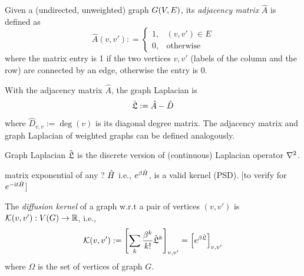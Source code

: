 \begin{definition}\label{def:adjacency_matrix}
	Given a (undirected, unweighted) graph $G(V,E)$, its \emph{adjacency matrix} $\hat{A}$ is defined as
	\begin{equation}
		\hat{A}(v,v') : = 
		\begin{cases}
			1, & (v,v') \in E \\
			0, & \text{otherwise}
		\end{cases}
	\end{equation}
	where the matrix entry is 1 if the two vertices $v,v'$ (labels of the column and the row) are connected by an edge, otherwise the entry is 0.
\end{definition}
\begin{definition}\label{def:graph_laplacian}
	With the adjacency matrix $\hat{A}$, the graph Laplacian is
	\begin{equation}
		\hat{\mathfrak{L}}:=\hat{A}-\hat{D}	
	\end{equation}
	where $\hat{D}_{v,v}:=\deg(v)$ is its diagonal degree matrix.
	The adjacency matrix and graph Laplacian of weighted graphs can be defined analogously.
\end{definition}
\begin{remark}
	Graph Laplacian $\hat{\mathfrak{L}}$ is the 
	discrete version of (continuous) Laplacian operator $\laplacian$.
	\cite{chungSpectralGraphTheory1997}
\end{remark}
\begin{lemma}
	matrix exponential of any ? $\hat{H}$ i.e., $e^{\beta \hat{H}}$, is a valid kernel (PSD). [to verify for $e^{-\textup{i} t\hat{H}}$]
\end{lemma}
\begin{definition}\label{def:diffusion_kernel}
	The \emph{diffusion kernel} of a graph w.r.t a pair of vertices $(v,v')$
	is $\mathcal{K}(v,v'):V(G)\to \mathbb{R}$, i.e.,
	\begin{equation}
		\mathcal{K}(v,v') := 
		\qty[\sum_{k}\frac{\beta^k}{k!}\hat{\mathfrak{L}}^k]_{v,v'}  =
		\qty[e^{\beta \hat{\mathfrak{L}}}]_{v,v'} 
	\end{equation}
	where $\Omega$ is the set of vertices of graph $G$.
\end{definition}

